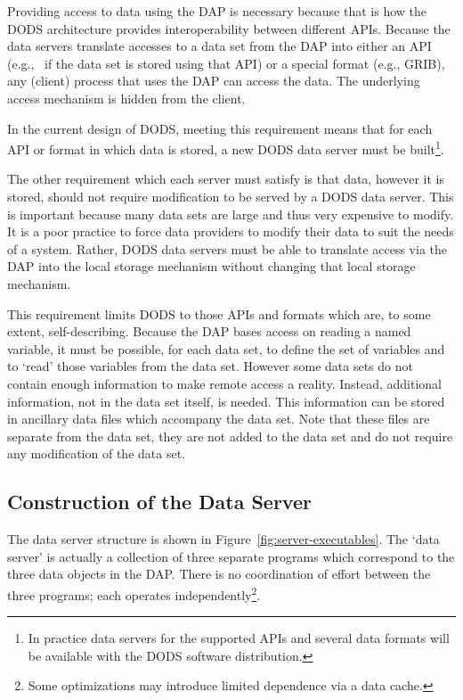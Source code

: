 Providing access to data using the DAP is necessary because that is how the
DODS architecture provides interoperability between different APIs. Because
the data servers translate accesses to a data set from the DAP into either
an API (e.g., \netcdf\ if the data set is stored using that API) or a special
format (e.g., GRIB), any (client) process that uses the DAP can access the
data. The underlying access mechanism is hidden from the client. 

In the current design of DODS, meeting this requirement means that for
each API or format in which data is stored, a new DODS data server must be
built\footnote{In practice data servers for the supported APIs and several
  data formats will be available with the DODS software distribution.}.

The other requirement which each server must satisfy is that data, however it
is stored, should not require modification to be served by a DODS data
server. This is important because many data sets are large and thus very
expensive to modify. It is a poor practice to force data providers to modify
their data to suit the needs of a system. Rather, DODS data servers must be
able to translate access via the DAP into the local storage mechanism
without changing that local storage mechanism.

This requirement limits DODS to those APIs and formats which are, to some
extent, self-describing. Because the DAP bases access on reading a named
variable, it must be possible, for each data set, to define the set of
variables and to `read' those variables from the data set. However some data
sets do not contain enough information to make remote access a
reality. Instead, additional information, not in the data set itself, is
needed. This information can be stored in ancillary data files which
accompany the data set. Note that these files are separate from the data
set, they are not added to the data set and do not require any modification
of the data set. 

\subsection{Construction of the Data Server}

The data server structure is shown in Figure~\ref{fig:server-executables}.
The `data server' is actually a collection of three separate programs which
correspond to the three data objects in the DAP\@. There is no coordination of
effort between the three programs; each operates independently\footnote{Some
  optimizations may introduce limited dependence via a data cache.}.  

